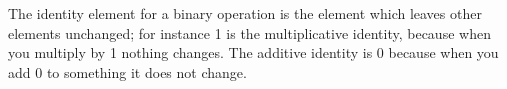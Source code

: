 The identity element for a binary operation is the element which
leaves other elements unchanged; for instance 1 is the multiplicative
identity, because when you multiply by 1 nothing changes. The additive 
identity is 0 because when you add 0 to something it does not change.
